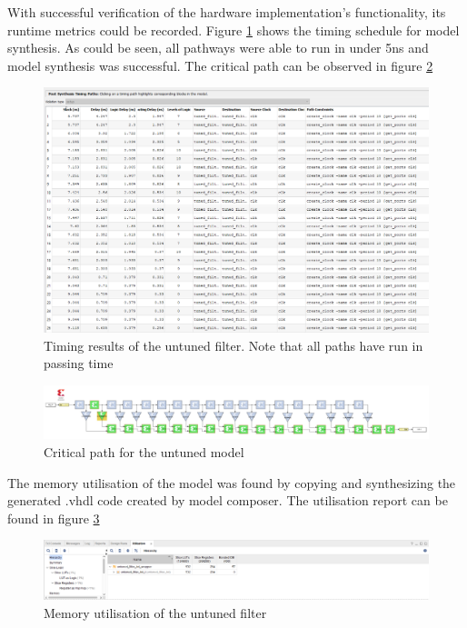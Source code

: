 \documentclass[12pt,a4paper]{article}
\begin{document}
With successful verification of the hardware implementation's functionality, its runtime metrics could be recorded. Figure \ref{fig:timing_results_untuned} shows the timing schedule for model synthesis. As could be seen, all pathways were able to run in under 5ns and model synthesis was successful. The critical path can be observed in figure \ref{fig:critical_untuned}

\begin{figure}[H]
    \centering
    \includegraphics[scale=0.25]{images/timing_results_untuned.PNG}
    \caption{Timing results of the untuned filter. Note that all paths have run in passing time}
    \label{fig:timing_results_untuned}
\end{figure}

\begin{figure}[H]
    \centering
    \includegraphics[scale=0.25]{images/untuned_critical.PNG}
    \caption{Critical path for the untuned model}
    \label{fig:critical_untuned}
\end{figure}

The memory utilisation of the model was found by copying and synthesizing the generated .vhdl code created by model composer. The utilisation report can be found in figure \ref{fig:untuned_utilisation}

\begin{figure}[H]
    \centering
    \includegraphics[scale=0.33]{images/untuned_utilisation.PNG}
    \caption{Memory utilisation of the untuned filter}
    \label{fig:untuned_utilisation}
\end{figure}
\end{document}
